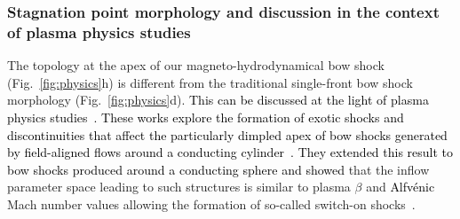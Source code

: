 \documentclass[useAMS,usenatbib]{mn2e}
\begin{document}
\subsubsection{Stagnation point morphology and discussion in the context of plasma physics studies}
\label{sect:}


The topology at the apex of our magneto-hydrodynamical bow shock
(Fig.~\ref{fig:physics}h) is different from the traditional single-front bow
shock morphology (Fig.~\ref{fig:physics}d). \textcolor{black}{This can be discussed at the light 
of plasma physics studies~\citep{sterck_phpl_1998,sterck_aa_343_1999}. These 
works explore the formation of exotic shocks and discontinuities that affect 
the particularly dimpled apex of bow shocks generated by field-aligned flows around a conducting 
cylinder~\citep{sterck_phpl_1998}. They extended this result to bow shocks 
produced around a conducting sphere and showed} that the inflow 
parameter space leading to such structures is similar to plasma $\beta$ and 
\textcolor{black}{Alfv\' enic} Mach number values allowing the formation of so-called switch-on 
shocks~\citep{sterck_aa_343_1999}. 
\end{document}
